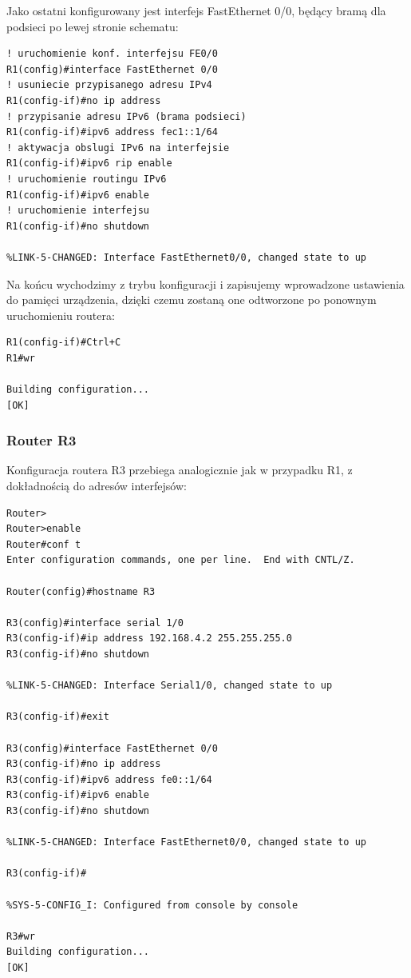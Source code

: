 \documentclass[polish,11pt,a4paper,twoside]{article}
\begin{document}
Jako ostatni konfigurowany jest interfejs FastEthernet 0/0, będący bramą dla podsieci po lewej stronie schematu:
\begin{lstlisting}
! uruchomienie konf. interfejsu FE0/0
R1(config)#interface FastEthernet 0/0
! usuniecie przypisanego adresu IPv4 
R1(config-if)#no ip address 
! przypisanie adresu IPv6 (brama podsieci)
R1(config-if)#ipv6 address fec1::1/64 
! aktywacja obslugi IPv6 na interfejsie
R1(config-if)#ipv6 rip enable
! uruchomienie routingu IPv6
R1(config-if)#ipv6 enable 
! uruchomienie interfejsu
R1(config-if)#no shutdown 

%LINK-5-CHANGED: Interface FastEthernet0/0, changed state to up
\end{lstlisting}
Na końcu wychodzimy z trybu konfiguracji i zapisujemy wprowadzone ustawienia do pamięci urządzenia, dzięki czemu zostaną one odtworzone po ponownym uruchomieniu routera:
\begin{lstlisting}
R1(config-if)#Ctrl+C
R1#wr

Building configuration...
[OK]
\end{lstlisting}


\subsubsection{Router R3}
Konfiguracja routera R3 przebiega analogicznie jak w przypadku R1, z dokładnością do adresów interfejsów:
\begin{lstlisting}
Router>
Router>enable
Router#conf t
Enter configuration commands, one per line.  End with CNTL/Z.

Router(config)#hostname R3

R3(config)#interface serial 1/0
R3(config-if)#ip address 192.168.4.2 255.255.255.0
R3(config-if)#no shutdown 

%LINK-5-CHANGED: Interface Serial1/0, changed state to up

R3(config-if)#exit

R3(config)#interface FastEthernet 0/0
R3(config-if)#no ip address 
R3(config-if)#ipv6 address fe0::1/64
R3(config-if)#ipv6 enable
R3(config-if)#no shutdown 

%LINK-5-CHANGED: Interface FastEthernet0/0, changed state to up

R3(config-if)#

%SYS-5-CONFIG_I: Configured from console by console

R3#wr
Building configuration...
[OK]
\end{lstlisting}
\end{document}
